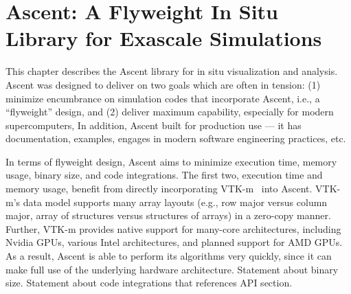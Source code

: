 %
%
%
\chapter{Ascent: A Flyweight In Situ Library for Exascale Simulations}
\label{ascent} %


This chapter describes the Ascent library for in situ visualization
and analysis.
%
Ascent was designed to deliver on two goals which are often in tension:
 (1) minimize encumbrance on simulation codes that incorporate Ascent,
i.e., a ``flyweight'' design, and 
(2) deliver maximum capability, especially for modern supercomputers,
%
In addition, Ascent built for production use --- it has documentation, 
examples, engages in modern software engineering practices, etc.

In terms of flyweight design, Ascent aims to minimize 
execution time, memory usage, binary size, and code integrations.
%
The first two, execution time and memory usage, benefit from directly
incorporating VTK-m~\cite{VTK-m} into Ascent.  
%
VTK-m's data model supports many array layouts (e.g., row major versus 
column major, array of structures versus structures of arrays) 
in a zero-copy manner.
%
Further, VTK-m provides native support for many-core architectures,
including Nvidia GPUs, various Intel architectures, 
and planned support for AMD GPUs.
%
As a result, Ascent is able to perform its algorithms very quickly,
since it can make full use of the underlying hardware architecture.
%
Statement about binary size.
%
Statement about code integrations that references API section.

